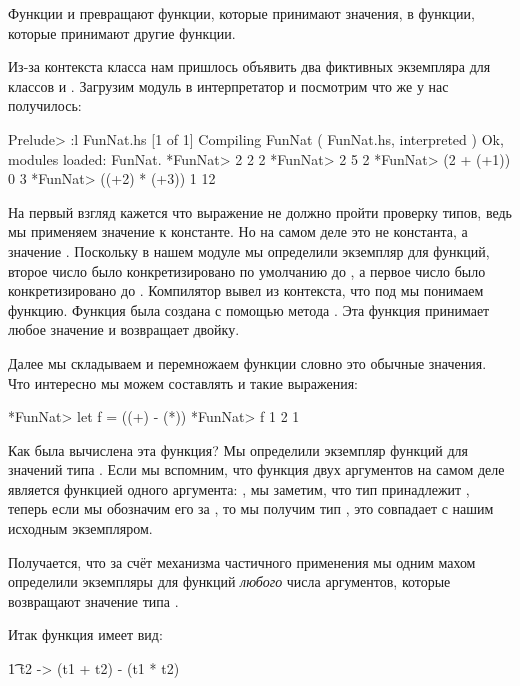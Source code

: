 Функции  и  превращают функции, которые
принимают значения, в функции, которые принимают другие
функции. 

Из-за контекста класса  нам пришлось объявить 
два фиктивных экземпляра для классов  и .
Загрузим модуль  в интерпретатор и 
посмотрим что же у нас получилось:

\begin{code}
Prelude> :l FunNat.hs
[1 of 1] Compiling FunNat           ( FunNat.hs, interpreted )
Ok, modules loaded: FunNat.
*FunNat> 2 2
2
*FunNat> 2 5
2
*FunNat> (2 + (+1)) 0 
3
*FunNat> ((+2) * (+3)) 1
12
\end{code}

На первый взгляд кажется что выражение  не должно
пройти проверку типов, ведь мы применяем значение к константе.
Но на самом деле  это не константа, а значение .
Поскольку в нашем модуле мы определили экземпляр  для
функций, второе число  было конкретизировано по умолчанию 
до , а первое число  было конкретизировано
до . Компилятор вывел из контекста,
что под  мы понимаем функцию. Функция была создана 
с помощью метода . Эта функция принимает любое 
значение и возвращает двойку.

Далее мы складываем и перемножаем функции словно это обычные значения.
Что интересно мы можем составлять и такие выражения:

\begin{code}
*FunNat> let f = ((+) - (*))
*FunNat> f 1 2
1
\end{code}

Как была вычислена эта функция? Мы определили экземпляр функций
для значений типа . Если мы вспомним, что
функция двух аргументов на самом деле является функцией одного
аргумента: , мы заметим, что 
тип  принадлежит , теперь если 
мы обозначим его за , то мы получим тип ,
это совпадает с нашим исходным экземпляром. 

Получается, что за счёт механизма частичного применения мы одним
махом определили экземпляры  для функций \emph{любого} 
числа аргументов, которые возвращают значение типа .

Итак функция  имеет вид:

\begin{code}
\t1 t2 -> (t1 + t2) - (t1 * t2)
\end{code}

